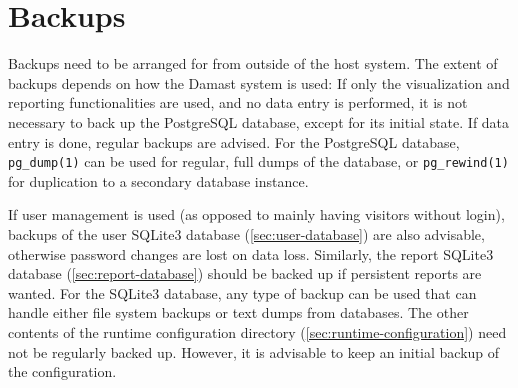 \section{Backups}

Backups need to be arranged for from outside of the host system.
The extent of backups depends on how the Damast system is used:
If only the visualization and reporting functionalities are used, and no data entry is performed, it is not necessary to back up the PostgreSQL database, except for its initial state.
If data entry is done, regular backups are advised.
For the PostgreSQL database, \verb!pg_dump(1)! can be used for regular, full dumps of the database, or \verb!pg_rewind(1)! for duplication to a secondary database instance.

If user management is used (as opposed to mainly having visitors without login), backups of the user SQLite3 database (\cref{sec:user-database}) are also advisable, otherwise password changes are lost on data loss.
Similarly, the report SQLite3 database (\cref{sec:report-database}) should be backed up if persistent reports are wanted.
For the SQLite3 database, any type of backup can be used that can handle either file system backups or text dumps from databases.
The other contents of the runtime configuration directory (\cref{sec:runtime-configuration}) need not be regularly backed up.
However, it is advisable to keep an initial backup of the configuration.
